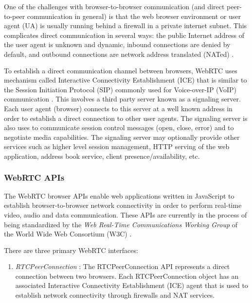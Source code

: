 \documentclass[9pt]{extarticle}
\begin{document}
\begin{multicols}{2}
One of the challenges with browser-to-browser communication (and
direct peer-to-peer communication in general) is that the web browser
environment or user agent (UA) is usually running behind a firewall in
a private internet subnet. This complicates direct communication in
several ways: the public Internet address of the user agent is unknown
and dynamic, inbound connections are denied by default, and outbound
connections are network address translated (NATed)
\cite[Section~3.4]{draft-rtcweb-transports}.

To establish a direct communication channel between browsers, WebRTC
uses mechanism called Interactive Connectivity Establishment (ICE)
that is similar to the Session Initiation Protocol (SIP) commonly used
for Voice-over-IP (VoIP) communication \cite{RFC5245:ice}. This
involves a third party server known as a signaling server. Each user
agent (browser) connects to this server at a well known address in
order to establish a direct connection to other user agents. The
signaling server is also uses to communicate session control messages
(open, close, error) and to negotiate media capabilities. %
The signaling server may optionally provide other services such as
higher level session management, HTTP serving of the web application,
address book service, client presence/availability, etc. %

\subsubsection{WebRTC APIs}

The WebRTC browser APIs enable web applications written in JavaScript
to establish browser-to-browser network connectivity in order to
perform real-time video, audio and data communication. These APIs are
currently in the process of being standardized by the \emph{Web
Real-Time Communications Working Group} of the World Wide Web
Consortium (W3C) \cite{webrtc:wg}.

There are three primary WebRTC interfaces:

\begin{enumerate}
\item \emph{RTCPeerConnection} \cite{webrtc:rtcpeerconnection:feb2015}:
    The RTCPeerConnection API represents a direct connection between
    two browsers. Each RTCPeerConnection object has an associated
    Interactive Connectivity Establishment (ICE) agent that is used to
    establish network connectivity through firewalls and NAT services.


\end{enumerate}
\end{multicols}
\end{document}
